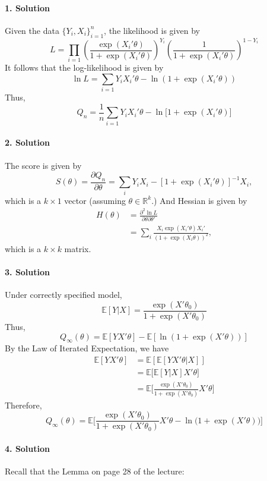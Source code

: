 \documentclass[11pt]{article}
\theoremstyle{definition}
\theoremstyle{boldtitle} %
\numberwithin{equation}{section}
\numberwithin{figure}{section}
\numberwithin{table}{section}
\begin{document}
\paragraph{1. Solution} Given the data $\{Y_i, X_i\}_{i=1}^n$, the likelihood is given by 
\[
L = \prod_{i=1} \left(
    \frac{\exp (X_i'\theta)}{1 + \exp (X_i'\theta)}
\right)^{Y_i} 
\left(
    \frac{1}{1 + \exp (X_i'\theta)}
\right)^{1 - Y_i} 
\]
It follows that the log-likelihood is given by 
\[
\ln L = \sum_{i=1} Y_i X_i'\theta - \ln(1 + \exp (X_i'\theta))
\]
Thus, 
\[
Q_n = \frac{1}{n} \sum_{i=1} Y_i X_i'\theta - \ln\bigg[1 + \exp (X_i'\theta)\bigg]
\]


\paragraph{2. Solution} 
The score is given by 
\[
S(\theta) = \frac{\partial Q_n}{\partial \theta} = \sum_i Y_i X_i - \left[ 1 + \exp(X_i'\theta) \right]^{-1} X_i,
\]
which is a $k \times 1$ vector (assuming $\theta \in \mathbb{R}^{k}$.)
And Hessian is given by 
\begin{align*}
H(\theta) & = \frac{\partial^2 \ln L}{\partial \theta \partial \theta'}  \\ 
    & = \sum_i \frac{X_i \exp (X_i'\theta)X_i'}{(1 + \exp(X_i \theta))^2},
\end{align*}
which is a $k \times k$ matrix. 

\paragraph{3. Solution} 
Under correctly specified model, 
\[
\mathbb{E}[Y|X] = \frac{\exp(X'\theta_0)}{1 + \exp(X'\theta_0)}
\]
Thus, 
\[
Q_\infty(\theta) = \mathbb{E}\left[YX'\theta \right] - \mathbb{E}[\ln(1+ \exp(X'\theta))]
\]
By the Law of Iterated Expectation, we have 
\begin{align*}
\mathbb{E}[YX'\theta] & = \mathbb{E}[\mathbb{E}[YX'\theta|X]] \\ 
    & = \mathbb{E}\bigg[\mathbb{E}[Y|X]X'\theta\bigg] \\ 
    & = \mathbb{E}\bigg[\frac{\exp(X'\theta_0)}{1 + \exp(X'\theta_0)}X'\theta\bigg] 
\end{align*}
Therefore, 
\[
Q_\infty(\theta) = \mathbb{E}\bigg[\frac{\exp(X'\theta_0)}{1 + \exp(X'\theta_0)}X'\theta - \ln \bigg(1 + \exp(X'\theta) \bigg)\bigg] 
\]


\paragraph{4. Solution} 
Recall that the Lemma on page 28 of the lecture:
\end{document}
